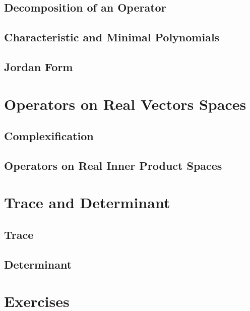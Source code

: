 \documentclass[11pt, letterpaper]{article}
\begin{document}
\newpage
\subsection{Decomposition of an Operator}

\newpage
\subsection{Characteristic and Minimal Polynomials}

\newpage
\subsection{Jordan Form}

\newpage
\section{Operators on Real Vectors Spaces}
\subsection{Complexification}

\newpage
\subsection{Operators on Real Inner Product Spaces}

\newpage
\section{Trace and Determinant}
\subsection{Trace}

\newpage
\subsection{Determinant}

\newpage
\section{Exercises}
\end{document}

